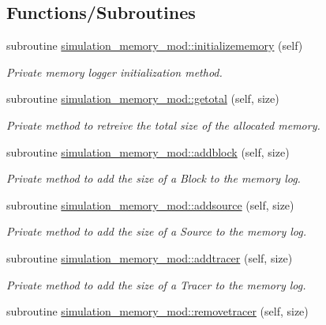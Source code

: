 \subsection*{Functions/\+Subroutines}
\begin{DoxyCompactItemize}
\item 
subroutine \mbox{\hyperlink{namespacesimulation__memory__mod_ac8306165e4ec88fec9a2b8b719f61893}{simulation\+\_\+memory\+\_\+mod\+::initializememory}} (self)
\begin{DoxyCompactList}\small\item\em Private memory logger initialization method. \end{DoxyCompactList}\item 
subroutine \mbox{\hyperlink{namespacesimulation__memory__mod_acf04d6b930ed3ffbc0950afd86033c51}{simulation\+\_\+memory\+\_\+mod\+::getotal}} (self, size)
\begin{DoxyCompactList}\small\item\em Private method to retreive the total size of the allocated memory. \end{DoxyCompactList}\item 
subroutine \mbox{\hyperlink{namespacesimulation__memory__mod_a4169689db37b3ba35e092096a7019f80}{simulation\+\_\+memory\+\_\+mod\+::addblock}} (self, size)
\begin{DoxyCompactList}\small\item\em Private method to add the size of a Block to the memory log. \end{DoxyCompactList}\item 
subroutine \mbox{\hyperlink{namespacesimulation__memory__mod_a940ff42fa3a49423f9ac98da2bffa54c}{simulation\+\_\+memory\+\_\+mod\+::addsource}} (self, size)
\begin{DoxyCompactList}\small\item\em Private method to add the size of a Source to the memory log. \end{DoxyCompactList}\item 
subroutine \mbox{\hyperlink{namespacesimulation__memory__mod_a5770021491589bbd61ea112d113a9c9d}{simulation\+\_\+memory\+\_\+mod\+::addtracer}} (self, size)
\begin{DoxyCompactList}\small\item\em Private method to add the size of a Tracer to the memory log. \end{DoxyCompactList}\item 
subroutine \mbox{\hyperlink{namespacesimulation__memory__mod_a5f95539e9740401e7046b79c40ad2ecd}{simulation\+\_\+memory\+\_\+mod\+::removetracer}} (self, size)

\end{DoxyCompactItemize}
